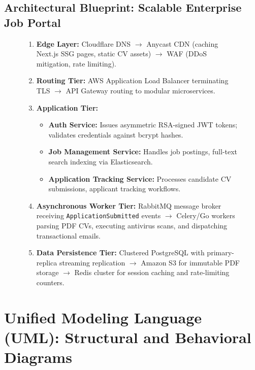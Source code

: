 \subsection{Architectural Blueprint: Scalable Enterprise Job Portal}
\begin{figure}[htbp]
\centering
\begin{tcolorbox}[colback=codebg, colframe=primary, title=\textbf{End-to-End Enterprise Architecture: Job Portal Platform}]
\begin{enumerate}
    \item \textbf{Edge Layer:} Cloudflare DNS $\to$ Anycast CDN (caching Next.js SSG pages, static CV assets) $\to$ WAF (DDoS mitigation, rate limiting).
    \item \textbf{Routing Tier:} AWS Application Load Balancer terminating TLS $\to$ API Gateway routing to modular microservices.
    \item \textbf{Application Tier:}
    \begin{itemize}
        \item \textbf{Auth Service:} Issues asymmetric RSA-signed JWT tokens; validates credentials against bcrypt hashes.
        \item \textbf{Job Management Service:} Handles job postings, full-text search indexing via Elasticsearch.
        \item \textbf{Application Tracking Service:} Processes candidate CV submissions, applicant tracking workflows.
    \end{itemize}
    \item \textbf{Asynchronous Worker Tier:} RabbitMQ message broker receiving \texttt{ApplicationSubmitted} events $\to$ Celery/Go workers parsing PDF CVs, executing antivirus scans, and dispatching transactional emails.
    \item \textbf{Data Persistence Tier:} Clustered PostgreSQL with primary-replica streaming replication $\to$ Amazon S3 for immutable PDF storage $\to$ Redis cluster for session caching and rate-limiting counters.
\end{enumerate}
\end{tcolorbox}
\end{figure}

\section{Unified Modeling Language (UML): Structural and Behavioral Diagrams}
\label{sec:se_uml_diagrams}


